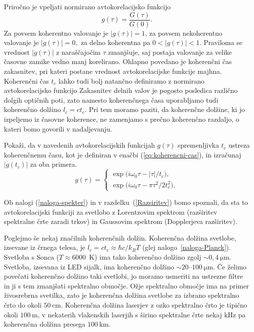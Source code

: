 Priročno je vpeljati normirano avtokorelacijsko funkcijo 
\begin{equation}
g(\tau)=\frac{G(\tau)}{G(0)}.
\label{eq:avtokorelacija-norm}
\end{equation}
Za povsem koherentno valovanje je $|g(\tau)|=1$, za povsem nekoherentno
valovanje je $|g(\tau)|=0,$ za delno koherentna  pa $0<|g(\tau)|<1$.
Praviloma se vrednost $|g(\tau)|$ z naraščajočim $\tau$ zmanjšuje,
saj postaja valovanje za velike časovne zamike vedno manj korelirano.
Ohlapno povedano je koherenčni čas zakasnitev, pri kateri postane
vrednost avtokorelacijske funkcije majhna.
Koherenčni čas $t_{c}$ lahko tudi bolj natančno definiramo 
z normirano avtokorelacijsko funkcijo
Zakasnitev delnih valov je pogosto posledica
različno dolgih optičnih poti, zato namesto koherenčnega časa 
uporabljamo tudi koherenčno dolžino $l_{c}=ct_{c}$. 
Pri tem moramo paziti, da koherenčne dolžine, ki jo izpeljemo iz časovne 
koherence, ne zamenjamo s prečno koherenčno
razdaljo, o kateri bomo govorili v nadaljevanju.

\begin{definition}
Pokaži, da v navedenih avtokorelacijskih
funkcijah $g(\tau)$ spremenljivka $t_{c}$ ustreza koherenčnemu času,
kot je definiran v enačbi (\ref{eq:koherencni-cas}), in izračunaj $|g(t_{c})|$ za oba primera.
\begin{equation}
g(\tau)=\begin{cases}
\exp\big(i\omega_{0}\tau-\left|\tau\right|/t_{c}\big),\\
\exp\big(i\omega_{0}\tau-\pi\tau^{2}/2t_{c}^{2}\big),
\end{cases}
\label{eq:gauss-eksponent}
\end{equation}

Ob nalogi (\ref{naloga-spekter}) in v razdelku~(\ref{Razsiritev}) 
bomo spoznali, da sta to avtokorelacijski
funkciji za svetlobo z Lorentzovim spektrom
(razširitev spektralne črte zaradi trkov) in Gaussovim spektrom
(Dopplerjeva razširitev).
\end{definition}

Poglejmo še nekaj značilnih koherenčnih dolžin. 
Koherenčna dolžina svetlobe, izsevane iz črnega telesa, je $l_{c}=ct_{c}\approx 
\hbar c/k_{B}T$ (glej nalogo~\ref{naloga-Planck}). 
Svetloba s Sonca ($T \approx 6000$~K)
ima tako koherenčno dolžino zgolj $\sim 0,4~\si{\micro\metre}$. Svetloba,
izsevana iz LED sijalk, ima koherenčno dolžino $\sim20$--$100~\si{\micro\metre}$.
Če želimo povečati koherenčno dolžino taki svetlobi, jo moramo usmeriti
na ustrezne filtre in ji s tem zmanjšati spektralno območje.
Ožje spektralno območje ima na primer živosrebrna svetilka, zato je koherenčna
dolžina svetlobe za izbrano spektralno črto do okoli $50~\si{\centi\metre}$.
Koherenčna dolžina laserjev z ozko spektralno črto je tipično okoli
$100~\si{\metre}$, v nekaterih vlakenskih laserjih s širino spektralne
črte nekaj $\si{\kilo\hertz}$ pa koherenčna dolžina presega $100~\si{\kilo\metre}$.

